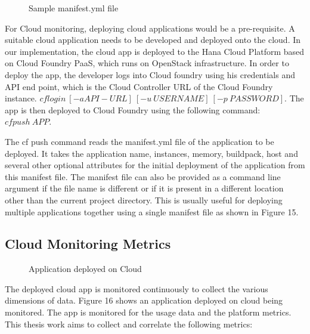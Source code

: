 \documentclass[article,type=msc,colorback,12pt,accentcolor=tud7b,table]{tudthesis}
\begin{document}
 \begin{figure}[!h]
 	\begin{center}
 		\makebox[\textwidth]{\texttt{[image: D2]}}
 	\end{center}
 	\caption{Sample manifest.yml file}
 \end{figure}
	
	For Cloud monitoring, deploying cloud applications would be a pre-requisite. A suitable cloud application needs to be developed and deployed onto the cloud. In our implementation, the cloud app is deployed to the Hana Cloud Platform based on Cloud Foundry PaaS, which runs on OpenStack \cite{openstack} infrastructure. In order to deploy the app, the developer logs into Cloud foundry using his credentials and API end point, which is the Cloud Controller URL of the Cloud Foundry instance. $ cf login \: [-a API-URL] \: [-u \: USERNAME] \: [-p \: PASSWORD] $. The app is then deployed to Cloud Foundry using the following command: $ cf push \: APP $.		

The cf push command reads the manifest.yml file of the application to be deployed. It takes the application name, instances, memory, buildpack, host and several other optional attributes for the initial deployment of the application from this manifest file. The manifest file can also be provided as a command line argument if the file name is different or if it is present in a different location other than the current project directory. This is usually useful for deploying multiple applications together using a single manifest file as shown in Figure 15.
	
\subsection{Cloud Monitoring Metrics} 

 \begin{figure}
 \begin{center}
  \makebox[\textwidth]{\texttt{[image: D1]}}
\end{center}
\caption{Application deployed on Cloud}
\end{figure}
	
The deployed cloud app is monitored continuously to collect the various dimensions of data. Figure 16 shows an application deployed on cloud being monitored. The app is monitored for the usage data and the platform metrics. This thesis work aims to collect and correlate the following metrics:
\end{document}
